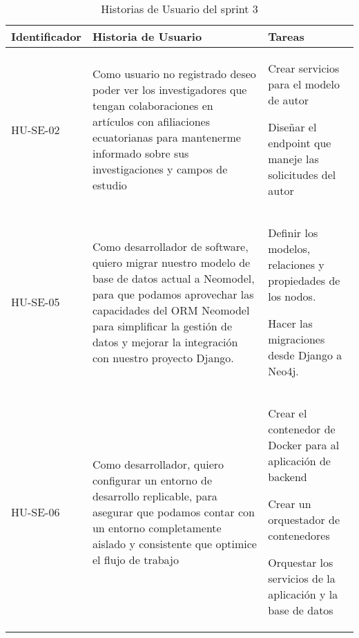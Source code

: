 \begin{table}[H]
    \centering
    \begin{tabular}{|p{2.5cm}|p{5cm}|p{6cm}|}
        \midrule
        \textbf{Identificador} & \textbf{Historia de Usuario}                                                                                                                                                                               & \textbf{Tareas} \\
        \hline
        HU-SE-02 & Como usuario no registrado deseo poder ver los investigadores que tengan colaboraciones en artículos con afiliaciones ecuatorianas para mantenerme informado sobre sus investigaciones y campos de estudio &
        \begin{compactitem}
            \item Crear servicios para el modelo de autor
            \item Diseñar el endpoint que maneje las solicitudes del autor
        \end{compactitem}
        \\
        \hline
        HU-SE-05 & Como desarrollador de software, quiero migrar nuestro modelo de base de datos actual a Neomodel, para que podamos aprovechar las capacidades del ORM Neomodel para simplificar la gestión de datos y mejorar la integración con nuestro proyecto Django.&
        \begin{compactitem}
            \item Definir los modelos, relaciones y propiedades de los nodos.
            \item Hacer las migraciones desde Django a Neo4j.
        \end{compactitem}
        \\
        \hline
        HU-SE-06 & Como desarrollador, quiero configurar un entorno de desarrollo replicable, para asegurar que podamos contar con un entorno completamente aislado y consistente que optimice el flujo de trabajo&
        \begin{compactitem}
            \item Crear el contenedor de Docker para al aplicación de backend
            \item Crear  un orquestador de contenedores
            \item Orquestar los servicios de la aplicación y la base de datos
        \end{compactitem}
        \\
        \hline
    \end{tabular}
    \caption{Historias de Usuario del sprint 3}
    \label{C2T3:Historias de Usuario del Sprint 3}
\end{table}
